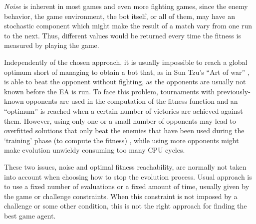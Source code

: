 \documentclass[runningheads,a4paper]{llncs}
\begin{document}
\textit{Noise} is inherent in most games and even more fighting games, since the enemy behavior, the game environment, the bot itself, or all of them, may have an
stochastic component which might make the result of a match vary from
one run to the next. Thus, different values would be returned
every time the fitness is measured by playing the game.

Independently of the chosen approach, it is usually impossible to reach a 
global optimum short of managing to obtain a bot that, as in Sun Tzu's ``Art of 
war'' \cite{tzu2013art}, is able to beat the opponent without fighting, as the 
opponents are usually not known before the EA is run.
To face this problem, tournaments with previously-known opponents are used in 
the computation of the fitness function and an ``optimum'' is reached when a 
certain number of victories are achieved against them. However, using only one 
or a small number of opponents may lead to overfitted solutions that only beat 
the enemies that have been used during the `training' phase (to compute the 
fitness) \cite{DBLP:journals/jcst/MoraFGGF12}, while using more opponents might 
make evolution unwieldy consuming too many CPU cycles.

These two issues, noise and optimal fitness reachability, are normally not 
taken into account when choosing how to stop the evolution process. Usual 
approach is to use a fixed number of evaluations or a fixed amount of time, 
usually given by the game or challenge constraints. When this constraint is not 
imposed by a challenge or some other condition, this is not the right approach 
for finding the best game agent. %
\end{document}
